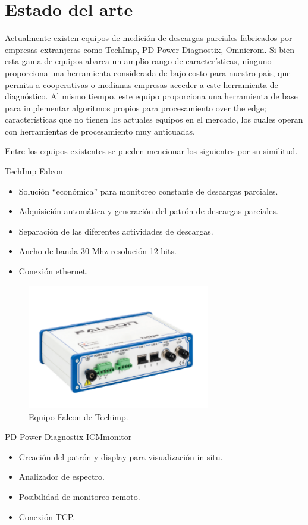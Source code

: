 \section{Estado del arte}
Actualmente existen equipos de medición de descargas parciales fabricados por empresas extranjeras como TechImp, PD Power Diagnostix, Omnicrom. Si bien esta gama de equipos abarca un amplio rango de características, ninguno proporciona una herramienta considerada de bajo costo para nuestro país, que permita a cooperativas o medianas empresas acceder a este herramienta de diagnóstico. Al mismo tiempo, este equipo proporciona una herramienta de base para implementar algoritmos propios para procesamiento over the edge; características que no tienen los actuales equipos en el mercado, los cuales operan con herramientas de procesamiento muy anticuadas.

Entre los equipos existentes se pueden mencionar los siguientes por su similitud.


TechImp Falcon
\begin{itemize}
\item Solución “económica” para monitoreo constante de descargas parciales.
\item Adquisición automática y generación del patrón de descargas parciales.
\item Separación de las diferentes actividades de descargas.
\item Ancho de banda 30 Mhz resolución 12 bits.
\item Conexión ethernet.
\end{itemize}

\begin{figure}[h!]
	\centering
	\includegraphics[width=80mm]{./Figures/arte1.png}
	\caption{Equipo Falcon de Techimp.}
	\label{fig:arte1}
\end{figure}


\vspace{10mm}
PD Power Diagnostix ICMmonitor
\begin{itemize}
\item Creación del patrón y display para visualización in-situ.
\item Analizador de espectro.
\item Posibilidad de monitoreo remoto.
\item Conexión TCP.
\end{itemize}

